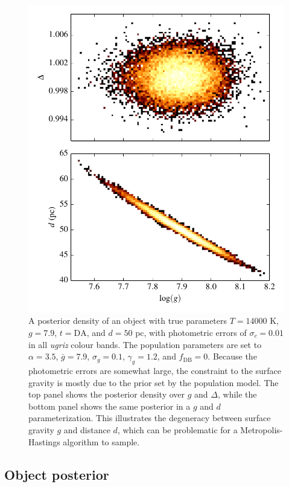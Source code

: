 \documentclass[fleqn,usenatbib]{mnras}
\newcommand{\Teff}{T}
\newcommand{\logg}{g}
\begin{document}
\begin{figure}
	\includegraphics[width=\columnwidth]{banana.pdf}
    \caption{A posterior density of an object with true parameters $\Teff=14000$ K, $\logg=7.9$, $t=\text{DA}$, and $d=50$ pc, with photometric errors of $\sigma_c=0.01$ in all \emph{ugriz} colour bands. The population parameters are set to $\alpha=3.5$, $\bar{g}=7.9$, $\sigma_g=0.1$, $\gamma_g=1.2$, and $f_\text{DB}=0$. Because the photometric errors are somewhat large, the constraint to the surface gravity is mostly due to the prior set by the population model. The top panel shows the posterior density over $\logg$ and $\Delta$, while the bottom panel shows the same posterior in a $\logg$ and $d$ parameterization. This illustrates the degeneracy between surface gravity $\logg$ and distance $d$, which can be problematic for a Metropolis-Hastings algorithm to sample.}
    \label{fig:banana}
\end{figure}







\subsection{Object posterior}\label{sec:objectposterior}
\end{document}
